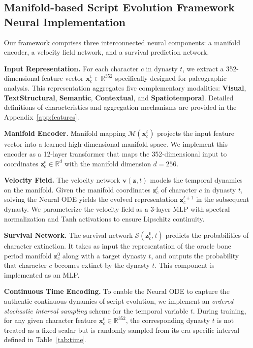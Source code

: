 \documentclass{article}
\begin{document}
\subsection{Manifold-based Script Evolution Framework Neural Implementation}
\label{sec:neural_implementation}

Our framework comprises three interconnected neural components: a manifold encoder, a velocity field network, and a survival prediction network.

\textbf{Input Representation.} For each character $c$ in dynasty $t$, we extract a 352-dimensional feature vector $\mathbf{x}_c^t \in \mathbb{R}^{352}$ specifically designed for paleographic analysis. This representation aggregates five complementary modalities: \textbf{Visual}, \textbf{TextStructural}, \textbf{Semantic}, \textbf{Contextual}, and \textbf{Spatiotemporal}. Detailed definitions of characteristics and aggregation mechanisms are provided in the Appendix~\ref{app:features}.

\textbf{Manifold Encoder.} Manifold mapping $\mathcal{M}(\mathbf{x}_c^t)$ projects the input feature vector into a learned high-dimensional manifold space. We implement this encoder as a 12-layer transformer that maps the 352-dimensional input to coordinates $\mathbf{z}_c^t \in \mathbb{R}^{d}$ with the manifold dimension $d=256$.

\textbf{Velocity Field.} The velocity network $\mathbf{v}(\mathbf{z}, t)$ models the temporal dynamics on the manifold. Given the manifold coordinates $\mathbf{z}_c^t$ of character $c$ in dynasty $t$, solving the Neural ODE yields the evolved representation $\mathbf{z}_c^{t+1}$ in the subsequent dynasty. We parameterize the velocity field as a 3-layer MLP with spectral normalization and Tanh activations to ensure Lipschitz continuity.

\textbf{Survival Network.} The survival network $\mathcal{S}(\mathbf{z}_c^0, t)$ predicts the probabilities of character extinction. It takes as input the representation of the oracle bone period manifold $\mathbf{z}_c^0$ along with a target dynasty $t$, and outputs the probability that character $c$ becomes extinct by the dynasty $t$. This component is implemented as an MLP.

\textbf{Continuous Time Encoding.} To enable the Neural ODE to capture the authentic continuous dynamics of script evolution, we implement an \textit{ordered stochastic interval sampling} scheme for the temporal variable $t$. During training, for any given character feature $\mathbf{x}_c^t \in \mathbb{R}^{352}$, the corresponding dynasty $t$ is not treated as a fixed scalar but is randomly sampled from its era-specific interval defined in Table~\ref{tab:time}. 
\end{document}
